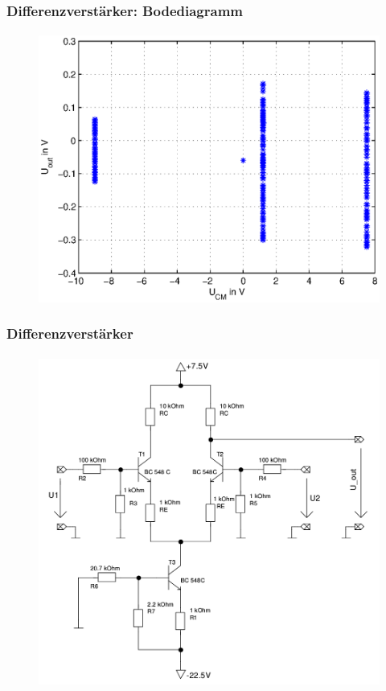 \begin{frame}
    \frametitle{Differenzverstärker: Bodediagramm}
    \framesubtitle{}
     \begin{figure}[H]
     \begin{center}
             \includegraphics[scale=0.5]{./img/bode/Aufgabe_3_3_U.eps}
     \end{center}
     \end{figure}
\end{frame}
\begin{frame}
    \frametitle{Differenzverstärker}
    \framesubtitle{}
    \begin{figure}[H]
    \begin{center}
            \includegraphics[scale=0.2]{./img/schaltungen/differenz_optimiert.png}
    \end{center}
    \end{figure}
\end{frame}
